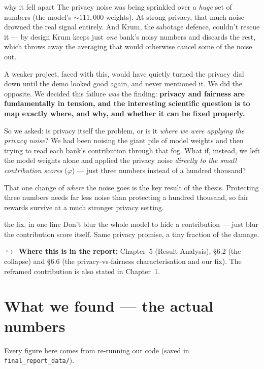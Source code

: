 \documentclass[11pt]{article}
\newcommand{\reportnote}[1]{%
  \par\vspace{3pt}%
  {\small\color{soft}$\hookrightarrow$\ \textbf{Where this is in the report:} #1}\par\vspace{2pt}}
\begin{document}
\begin{plain}{why it fell apart}
The privacy noise was being sprinkled over a \emph{huge} set of numbers (the model's ${\sim}111{,}000$
weights). At strong privacy, that much noise drowned the real signal entirely. And Krum, the sabotage
defence, couldn't rescue it --- by design Krum keeps just \emph{one} bank's noisy numbers and discards
the rest, which throws away the averaging that would otherwise cancel some of the noise out.
\end{plain}

A weaker project, faced with this, would have quietly turned the privacy dial down until the demo looked
good again, and never mentioned it. We did the opposite. We decided this failure \emph{was} the finding:
\textbf{privacy and fairness are fundamentally in tension, and the interesting scientific question is to
map exactly where, and why, and whether it can be fixed properly.}

So we asked: is privacy itself the problem, or is it \emph{where we were applying the privacy noise}? We
had been noising the giant pile of model weights and then trying to read each bank's contribution
through that fog. What if, instead, we left the model weights alone and applied the privacy noise
\emph{directly to the small contribution scores} ($\varphi$) --- just three numbers instead of a
hundred thousand?

That one change of \emph{where} the noise goes is the key result of the thesis. Protecting three numbers
needs far less noise than protecting a hundred thousand, so fair rewards survive at a much stronger
privacy setting.

\begin{plain}{the fix, in one line}
Don't blur the whole model to hide a contribution --- just blur the contribution score itself. Same
privacy promise, a tiny fraction of the damage.
\end{plain}

\reportnote{Chapter~5 (Result Analysis), \S6.2 (the collapse) and \S6.6 (the privacy-vs-fairness
characterisation and our fix). The reframed contribution is also stated in Chapter~1.}

\section{What we found --- the actual numbers}

Every figure here comes from re-running our code (saved in \texttt{final\_report\_data/}).
\end{document}
